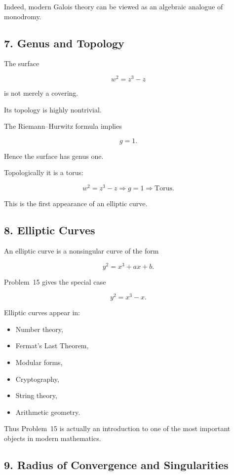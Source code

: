 \documentclass[12pt,a4paper]{article}
\theoremstyle{notespace}
\begin{document}
Indeed, modern Galois theory can be viewed as an algebraic analogue of monodromy.

\bigskip

\subsection{7. Genus and Topology}

The surface

\[
w^2=z^3-z
\]

is not merely a covering.

Its topology is highly nontrivial.

The Riemann--Hurwitz formula implies

\[
g=1.
\]

Hence the surface has genus one.

Topologically it is a torus:

\[
\boxed{
	w^2=z^3-z
	\Longrightarrow
	g=1
	\Longrightarrow
	\text{Torus}.
}
\]

This is the first appearance of an elliptic curve.

\bigskip

\subsection{8. Elliptic Curves}

An elliptic curve is a nonsingular curve of the form

\[
y^2=x^3+ax+b.
\]

Problem~15 gives the special case

\[
y^2=x^3-x.
\]

Elliptic curves appear in:

\begin{itemize}
	\item Number theory,
	\item Fermat's Last Theorem,
	\item Modular forms,
	\item Cryptography,
	\item String theory,
	\item Arithmetic geometry.
\end{itemize}

Thus Problem~15 is actually an introduction to one of the most important objects in modern mathematics.

\bigskip

\subsection{9. Radius of Convergence and Singularities}
\end{document}
